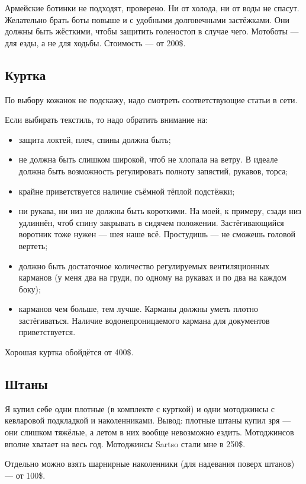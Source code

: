\documentclass[12pt,a4paper]{article}
\begin{document}
Армейские ботинки не подходят, проверено. Ни от холода, ни от воды не
спасут. Желательно брать боты повыше и с удобными долговечными
застёжками. Они должны быть жёсткими, чтобы защитить голеностоп в
случае чего. Мотоботы --- для езды, а не для ходьбы. Стоимость --- от 200\$.

\subsection{Куртка}

По выбору кожанок не подскажу, надо смотреть соответствующие статьи
в сети.

Если выбирать текстиль, то надо обратить внимание на:

\begin{itemize}
\item защита локтей, плеч, спины должна быть;
\item не должна быть слишком широкой, чтоб не хлопала на ветру.
В идеале должна быть возможность регулировать полноту запястий,
рукавов, торса;
\item крайне приветствуется наличие съёмной тёплой подстёжки;
\item ни рукава, ни низ не должны быть короткими. На моей, к примеру,
сзади низ удлиннён, чтоб спину закрывать в сидячем положении.
Застёгивающийся воротник тоже нужен --- шея наше всё. Простудишь --- не
сможешь головой вертеть;
\item должно быть достаточное количество регулируемых вентиляционных
карманов (у меня два на груди, по одному на рукавах и по два на каждом
боку);
\item карманов чем больше, тем лучше. Карманы должны уметь плотно
застёгиваться. Наличие водонепроницаемого кармана для документов
приветствуется.
\end{itemize}

Хорошая куртка обойдётся от 400\$.

\subsection{Штаны}

Я купил себе одни плотные (в комплекте с курткой) и одни мотоджинсы с
кевларовой подкладкой и наколенниками. Вывод: плотные штаны купил зря ---
они слишком тяжёлые, а летом в них вообще невозможно ездить.
Мотоджинсов вполне хватает на весь год. Мотоджинсы Sartso стали мне в
250\$.

Отдельно можно взять шарнирные наколенники (для надевания поверх
штанов) --- от 100\$.
\end{document}
